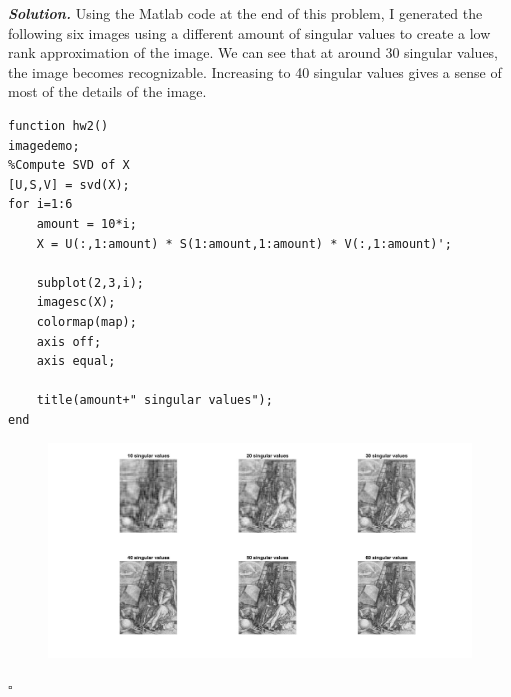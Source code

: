 \documentclass[12pt]{report}
\newenvironment{solution}[1][\it{Solution}]{\textbf{#1. } }{$\square$}
\begin{document}
\begin{solution}
    Using the Matlab code at the end of this problem, I generated the following six images using a different amount of singular values to create a low rank approximation of the image. We can see that at around 30 singular values, the image becomes recognizable. Increasing to 40 singular values gives a sense of most of the details of the image. 
\begin{verbatim}
function hw2()
imagedemo;
%Compute SVD of X
[U,S,V] = svd(X);
for i=1:6
    amount = 10*i;
    X = U(:,1:amount) * S(1:amount,1:amount) * V(:,1:amount)';
    
    subplot(2,3,i);
    imagesc(X);
    colormap(map);
    axis off;
    axis equal;
    
    title(amount+" singular values");
end
\end{verbatim}
    \begin{figure}
        \includegraphics[width=\linewidth]{hw2.jpg}
      \end{figure}
\end{solution}
\end{document}
